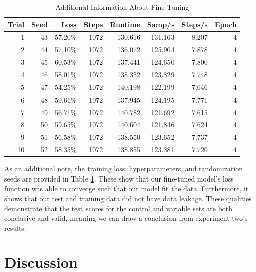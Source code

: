 \documentclass[12pt,letterpaper]{article}
\begin{document}
\begin{table}[!b]
    \centering
    \begin{tabular}{|r|r|r|r|r|r|r|r|}
    \hline
        Trial & Seed & Loss & Steps & Runtime & Samp/s & Steps/s & Epoch \\ \hline
        1 & 43 &57.20\% & 1072 & 130.616 & 131.163 & 8.207 & 4 \\ \hline
        2 & 44 &57.10\% & 1072 & 136.072 & 125.904 & 7.878 & 4 \\ \hline
        3 & 45 &60.53\% & 1072 & 137.441 & 124.650 & 7.800 & 4 \\ \hline
        4 & 46 &58.01\% & 1072 & 138.352 & 123.829 & 7.748 & 4 \\ \hline
        5 & 47 &54.25\% & 1072 & 140.198 & 122.199 & 7.646 & 4 \\ \hline
        6 & 48 &59.61\% & 1072 & 137.945 & 124.195 & 7.771 & 4 \\ \hline
        7 & 49 &56.71\% & 1072 & 140.782 & 121.692 & 7.615 & 4 \\ \hline
        8 & 50 &59.65\% & 1072 & 140.604 & 121.846 & 7.624 & 4 \\ \hline
        9 & 51 &56.58\% & 1072 & 138.550 & 123.652 & 7.737 & 4 \\ \hline
        10 & 52 &58.35\% & 1072 & 138.855 & 123.381 & 7.720 & 4 \\ \hline
    \end{tabular}
    \caption{Additional Information About Fine-Tuning}
    \label{t:finetuning}
\end{table}

As an additional note, the training loss, hyperparameters, and randomization seeds are provided in Table \ref{t:finetuning}. These show that our fine-tuned model's loss function was able to converge such that our model fit the data. Furthermore, it shows that our test and training data did not have data leakage. These qualities demonstrate that the test scores for the control and variable sets are both conclusive and valid, meaning we can draw a conclusion from experiment two's results. 




\section{Discussion}
\end{document}
